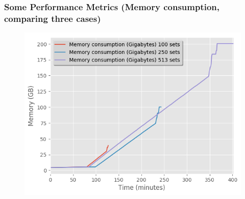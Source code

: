 \documentclass[9pt,sansserif]{beamer}
\begin{document}
\begin{frame}{}\small
\frametitle{Some Performance Metrics (Memory consumption, comparing three cases) }

\begin{figure}[hb!]
\centering\leavevmode
\graphicspath{{./png/Benchmarks/}}
%
\hspace{-4cm}
\begin{minipage}{10cm}
\centering\leavevmode
\includegraphics[scale=0.55]{Fig_all.png}
\end{minipage}
\end{figure}
\end{frame}


\end{document}
